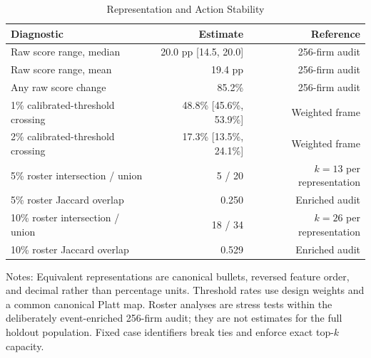\begin{table}[!htbp]
\centering
\caption{Representation and Action Stability}
\label{tab:stability}
\begin{threeparttable}
\begin{tabular}{lrr}
\toprule
Diagnostic & Estimate & Reference \\
\midrule
Raw score range, median & 20.0 pp [14.5, 20.0] & 256-firm audit \\
Raw score range, mean & 19.4 pp & 256-firm audit \\
Any raw score change & 85.2\% & 256-firm audit \\
1\% calibrated-threshold crossing & 48.8\% [45.6\%, 53.9\%] & Weighted frame \\
2\% calibrated-threshold crossing & 17.3\% [13.5\%, 24.1\%] & Weighted frame \\
5\% roster intersection / union & 5 / 20 & $k=13$ per representation \\
5\% roster Jaccard overlap & 0.250 & Enriched audit \\
10\% roster intersection / union & 18 / 34 & $k=26$ per representation \\
10\% roster Jaccard overlap & 0.529 & Enriched audit \\
\bottomrule
\end{tabular}
\begin{tablenotes}[flushleft]\footnotesize
\item Notes: Equivalent representations are canonical bullets, reversed feature order, and decimal rather than percentage units. Threshold rates use design weights and a common canonical Platt map. Roster analyses are stress tests within the deliberately event-enriched 256-firm audit; they are not estimates for the full holdout population. Fixed case identifiers break ties and enforce exact top-$k$ capacity.
\end{tablenotes}
\end{threeparttable}
\end{table}
